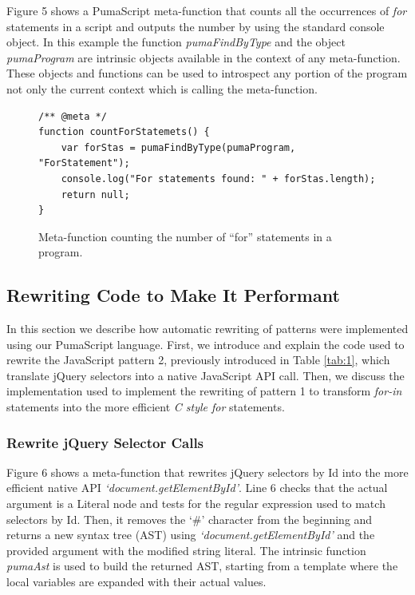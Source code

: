 \documentclass[preprint,10pt]{sigplanconf}
\begin{document}
Figure 5 shows a PumaScript meta-function that counts all the occurrences of \emph{for} statements in a script and outputs the number by using the standard console object. In this example the function \emph{pumaFindByType} and the object \emph{pumaProgram} are intrinsic objects available in the context of any meta-function. These objects and functions can be used to introspect any portion of the program not only the current context which is calling the meta-function.

\begin{figure}
\begin{lstlisting}
/** @meta */
function countForStatemets() {
    var forStas = pumaFindByType(pumaProgram, "ForStatement");
    console.log("For statements found: " + forStas.length);
    return null;
}
\end{lstlisting}
\caption{Meta-function counting the number of “for” statements in a program.}
\label{fig:5}
\end{figure}

\subsection{Rewriting Code to Make It Performant}
In this section we describe how automatic rewriting of patterns were implemented using our PumaScript language. First, we introduce and explain the code used to rewrite the JavaScript pattern 2, previously introduced in Table \ref{tab:1}, which translate jQuery selectors into a native JavaScript API call. Then, we discuss the implementation used to implement the rewriting of pattern 1 to transform \emph{for-in} statements into the more efficient \emph{C style for} statements.

\subsubsection{Rewrite jQuery Selector Calls}
Figure 6 shows a meta-function that rewrites jQuery selectors by Id into the more efficient native API \emph{`document.getElementById'}. Line 6 checks that the actual argument is a Literal node and tests for the regular expression used to match selectors by Id. Then, it removes the `\#' character from the beginning and returns a new syntax tree (AST) using \emph{`document.getElementById'} and the provided argument with the modified string literal. The intrinsic function \emph{pumaAst} is used to build the returned AST, starting from a template where the local variables are expanded with their actual values.
\end{document}
